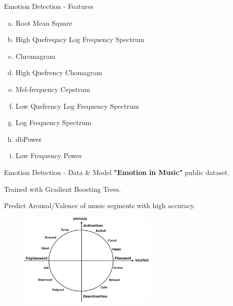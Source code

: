 \begin{frame}{Emotion Detection - Features}
\begin{enumerate}[(a)]
    \item Root Mean Square
    \item High Quefreqncy Log Frequency Spectrum
    \item Chromagram
    \item High Quefrency Chomagram
    \item Mel-frequency Cepstrum
    \item Low Quefrency Log Frequency Spectrum
    \item Log Frequency Spectrum
    \item dbPower
    \item Low Frequency Power
\end{enumerate}
\end{frame}

\begin{frame}{Emotion Detection - Data \& Model}
       \textbf{"Emotion in Music"} public dataset.

     Trained with Gradient Boosting Trees.

     Predict Arousal/Valence of music segments with high accuracy.
\begin{figure}[H]
  \centering
  \includegraphics[width=0.6\textwidth]{res/av.jpg}
\end{figure}

\end{frame}

